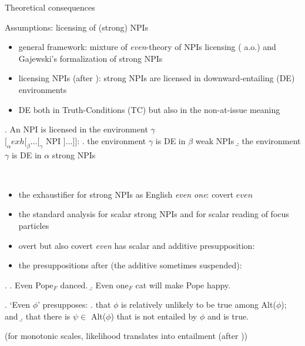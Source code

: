 \documentclass[
  ignorenonframetext,
]{beamer}
\providecommand{\tightlist}{%
  \setlength{\itemsep}{0pt}\setlength{\parskip}{0pt}}
\begin{document}
\begin{frame}{Theoretical consequences}
\protect\hypertarget{theoretical-consequences}{}
\begin{block}{Assumptions: licensing of (strong) NPIs}
\protect\hypertarget{assumptions-licensing-of-strong-npis}{}
\begin{itemize}
\tightlist
\item
  general framework: mixture of \emph{even}-theory of NPIs licensing
  (\citealt{krifka1995semantics,lahiri1998focus,crnivc2014non} a.o.) and
  Gajewski's formalization of strong NPIs \cite{gajewski2011licensing}
\item
  licensing NPIs (after \citet{gajewski2011licensing}): strong NPIs are
  licensed in downward-entailing (DE) environments
\item
  DE both in Truth-Conditions (TC) but also in the non-at-issue meaning
\end{itemize}

\ex. An NPI is licensed in the environment \(\gamma\)\\
\([_\alpha exh [_\beta \ldots [_\gamma\) NPI \(] \ldots ]]\): \a. the
environment \(\gamma\) is DE in \(\beta\) \hfill weak NPIs \b. the
environment \(\gamma\) is DE in \(\alpha\) \hfill strong NPIs

~
\end{block}
\end{frame}

\begin{frame}
\begin{itemize}
\tightlist
\item
  the exhaustifier for strong NPIs as English \emph{even one}: covert
  \(even\)
\item
  the standard analysis for scalar strong NPIs \citet{crnivc2014against}
  and for scalar reading of focus particles \citet{panizza2020minimal}
\item
  overt but also covert \emph{even} has scalar \Next[a] and additive
  \Next[b] presupposition:
\item
  the presuppositions after \citet{panizza2020minimal} (the additive
  sometimes suspended):
\end{itemize}

\ex. \a. Even Pope\(_F\) danced. \b. Even one\(_F\) cat will make Pope
happy.

\ex. `Even \(\phi\)' presupposes: \a. that \(\phi\) is relatively
unlikely to be true among Alt(\(\phi\)); and \b. that there is
\(\psi \in\) Alt(\(\phi\)) that is not entailed by \(\phi\) and is true.

\footnotesize(for monotonic scales, likelihood translates into
entailment (after \citealt{crnic2011getting}))\normalsize
\end{frame}
\end{document}
